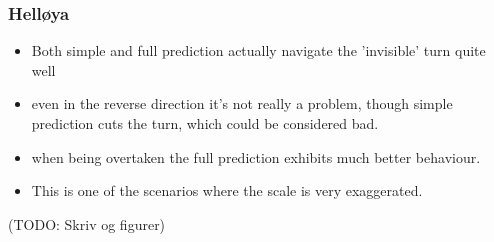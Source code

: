 \subsubsection{Helløya}
\begin{itemize}
    \item Both simple and full prediction actually navigate the 'invisible' turn quite well
    \item even in the reverse direction it's not really a problem, though simple prediction cuts the turn, which could be considered bad.
    \item when being overtaken the full prediction exhibits much better behaviour.
    \item This is one of the scenarios where the scale is very exaggerated.
\end{itemize}
(TODO: Skriv og figurer)
\clearpage
